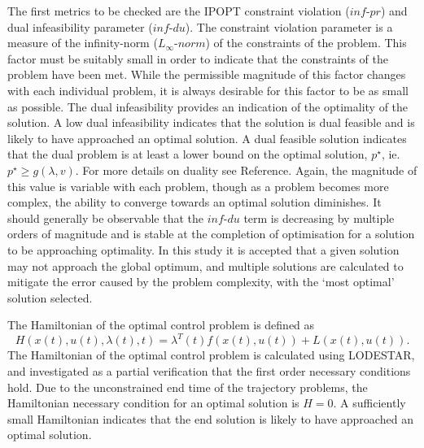 The first metrics to be checked are the IPOPT constraint violation ($inf\textrm{-}pr$) and dual infeasibility parameter ($inf\textrm{-}du$)\cite{Kawajir2010}. The constraint violation parameter is a measure of the infinity-norm ($L_\infty\textrm{-}norm$) of the constraints of the problem\cite{Kawajir2010}. This factor must be suitably small in order to indicate that the constraints of the problem have been met. While the permissible magnitude of this factor changes with each individual problem, it is always desirable for this factor to be as small as possible. The dual infeasibility provides an indication of the optimality of the solution. A low dual infeasibility indicates that the solution is dual feasible and is likely to have approached an optimal solution. A dual feasible solution indicates that the dual problem is at least a lower bound on the optimal solution, $p^\star$, ie. $p^\star \geq g(\lambda,v)$. For more details on duality see Reference\cite{Hindi2006}.
 Again, the magnitude of this value is variable with each problem, though as a problem becomes more complex, the ability to converge towards an optimal solution diminishes. It should generally be observable that the $inf\textrm{-}du$ term is decreasing by multiple orders of magnitude and is stable at the completion of optimisation for a solution to be approaching optimality. In this study it is accepted that a given solution may not approach the global optimum, and multiple solutions are calculated to mitigate the error caused by the problem complexity, with the `most optimal' solution selected. 


The Hamiltonian of the optimal control problem is defined as 
\begin{equation}
H(x(t),u(t),\lambda(t),t) = \lambda^T(t)f(x(t),u(t)) + L(x(t),u(t)).
\end{equation}
The Hamiltonian of the optimal control problem is calculated using LODESTAR, and investigated as a partial verification that the first order necessary conditions hold. Due to the unconstrained end time of the trajectory problems, the Hamiltonian necessary condition for an optimal solution is $H = 0 $\cite{Pucci2007}. 
 A sufficiently small Hamiltonian indicates that the end solution is likely to have approached an optimal solution.


